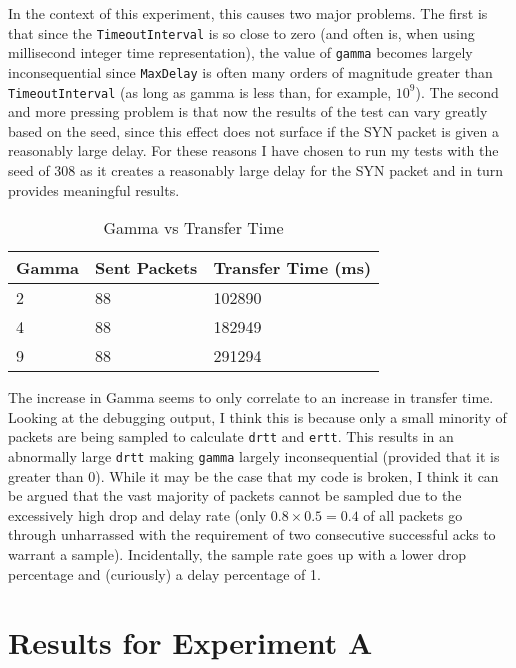 \documentclass[a4paper]{article}
\begin{document}
In the context of this experiment, this causes two major problems. The first is that since the
\texttt{TimeoutInterval} is so close to zero (and often is, when using millisecond integer time representation),
the value of \texttt{gamma} becomes largely inconsequential since
\texttt{MaxDelay} is often many orders of magnitude greater than \texttt{TimeoutInterval}
(as long as gamma is less than, for example, $10^9$). The second and more pressing problem is that now the
results of the test can vary greatly based on the seed, since this effect does not surface 
if the SYN packet is given a reasonably large delay.
For these reasons I have chosen to run my tests with the seed of 308 as it creates
a reasonably large delay for the SYN packet and in turn provides meaningful results.

\begin{table}[htbp]
\centering
\caption{Gamma vs Transfer Time}
\label{exp2}
\begin{tabular}{@{}lll@{}}
\toprule
Gamma & Sent Packets & Transfer Time (ms) \\ \midrule
2     & 88           & 102890             \\
4     & 88           & 182949             \\
9     & 88           & 291294             \\ \bottomrule
\end{tabular}
\end{table}

The increase in Gamma seems to only correlate to an increase in transfer time. Looking at the debugging output,
I think this is because only a small minority of packets are being sampled to calculate \texttt{drtt} and
\texttt{ertt}. This results in an abnormally large \texttt{drtt} making \texttt{gamma} largely inconsequential
(provided that it is greater than 0). While it may be the case that my code is broken, I think it can be argued
that the vast majority of packets cannot be sampled due to the excessively high drop and delay rate (only 
$0.8 \times 0.5 = 0.4$ of all packets go through unharrassed with the requirement of two consecutive successful
acks to warrant a sample). Incidentally, the sample rate goes up with a lower drop percentage and (curiously) a
delay percentage of 1.

\newpage
\appendix

\section{Results for Experiment A} \label{expa}
\end{document}
